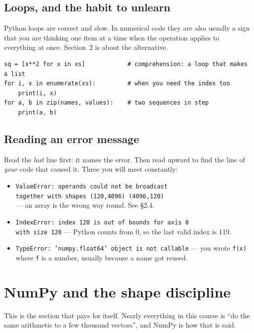 \documentclass[11pt]{article}
\begin{document}
\subsection{Loops, and the habit to unlearn}

Python loops are correct and slow. In numerical code they are also usually a
sign that you are thinking one item at a time when the operation applies to
everything at once. Section~2 is about the alternative.

\begin{lstlisting}
sq = [x**2 for x in xs]            # comprehension: a loop that makes a list
for i, x in enumerate(xs):         # when you need the index too
    print(i, x)
for a, b in zip(names, values):    # two sequences in step
    print(a, b)
\end{lstlisting}

\subsection{Reading an error message}

Read the \emph{last} line first: it names the error. Then read upward to find
the line of \emph{your} code that caused it. Three you will meet constantly:

\begin{itemize}
\item \texttt{ValueError: operands could not be broadcast}\\
      \texttt{together with shapes (120,4096) (4096,120)}\\
      --- an array is the wrong way round. See §2.4.
\item \texttt{IndexError: index 120 is out of bounds for axis 0}\\
      \texttt{with size 120} --- Python counts from 0, so the last valid index
      is 119.
\item \texttt{TypeError: 'numpy.float64' object is not callable} --- you wrote
      \texttt{f(x)} where \texttt{f} is a number, usually because a name got
      reused.
\end{itemize}

\section{NumPy and the shape discipline}

This is the section that pays for itself. Nearly everything in this course is
``do the same arithmetic to a few thousand vectors'', and NumPy is how that is
said.
\end{document}
